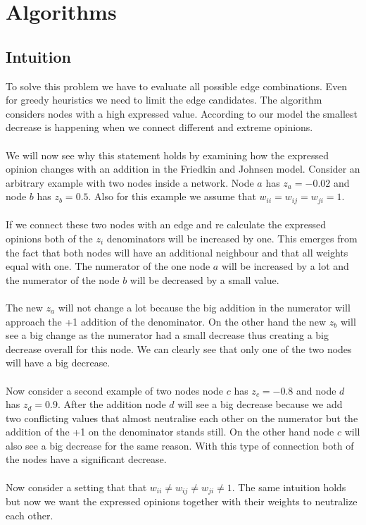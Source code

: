 \chapter{Algorithms}
\label{ch:algorithms}


\section{Intuition}
\label{sec:intuition}

To solve this problem we have to evaluate all possible edge combinations. Even for greedy heuristics we need to limit the edge candidates. The algorithm considers nodes with a high expressed value. According to our model the smallest decrease is happening when we connect different and extreme opinions.
\\
\\
We will now see why this statement holds by examining how the expressed opinion changes with an addition in the Friedkin and Johnsen model. Consider an arbitrary example with two nodes inside a network. Node $a$ has $z_a = -0.02$ and node $b$ has $z_b = 0.5$. Also for this example we assume that $w_{ii}=w_{ij}=w_{ji}=1$. 
\\
\\
If we connect these two nodes with an edge and re calculate the expressed opinions both of the $z_i$ denominators will be increased by one. This emerges from the fact that both nodes will have an additional neighbour and that all weights equal with one. The numerator of the one node $a$ will be increased by a lot and the numerator of the node $b$ will be decreased by a small value.
\\
\\
The new $z_a$ will not change a lot because the big addition in the numerator will approach the +1 addition of the denominator. On the other hand the new $z_b$ will see a big change as the numerator had a small decrease thus creating a big decrease overall for this node. We can clearly see that only one of the two nodes will have a big decrease. 
\\
\\
Now consider a second example of two nodes node $c$ has $z_c = -0.8$ and node $d$ has $z_d = 0.9$. After the addition node $d$ will see a big decrease because we add two conflicting values that almost neutralise each other on the numerator but the addition of the +1 on the denominator stands still. On the other hand node $c$ will also see a big decrease for the same reason. With this type of connection both of the nodes have a significant decrease.
\\
\\
Now consider a setting that that $w_{ii} \neq w_{ij} \neq w_{ji}\neq 1$. The same intuition holds but now we want the expressed opinions together with their weights to neutralize each other.

